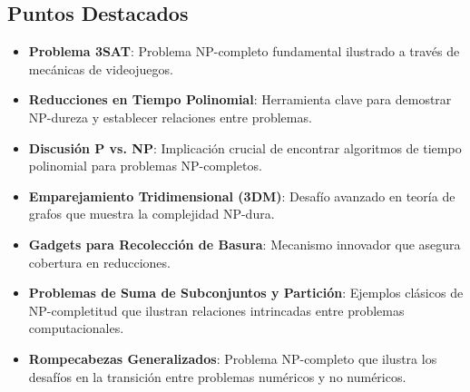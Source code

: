 \documentclass[letter, 12pt]{article}
\begin{document}
    \subsection*{Puntos Destacados}
    \begin{itemize}
        \item \textbf{Problema 3SAT}: Problema NP-completo fundamental ilustrado a través de mecánicas de videojuegos.
        \item \textbf{Reducciones en Tiempo Polinomial}: Herramienta clave para demostrar NP-dureza y establecer relaciones entre problemas.
        \item \textbf{Discusión P vs. NP}: Implicación crucial de encontrar algoritmos de tiempo polinomial para problemas NP-completos.
        \item \textbf{Emparejamiento Tridimensional (3DM)}: Desafío avanzado en teoría de grafos que muestra la complejidad NP-dura.
        \item \textbf{Gadgets para Recolección de Basura}: Mecanismo innovador que asegura cobertura en reducciones.
        \item \textbf{Problemas de Suma de Subconjuntos y Partición}: Ejemplos clásicos de NP-completitud que ilustran relaciones intrincadas entre problemas computacionales.
        \item \textbf{Rompecabezas Generalizados}: Problema NP-completo que ilustra los desafíos en la transición entre problemas numéricos y no numéricos.
    \end{itemize}
\end{document}

